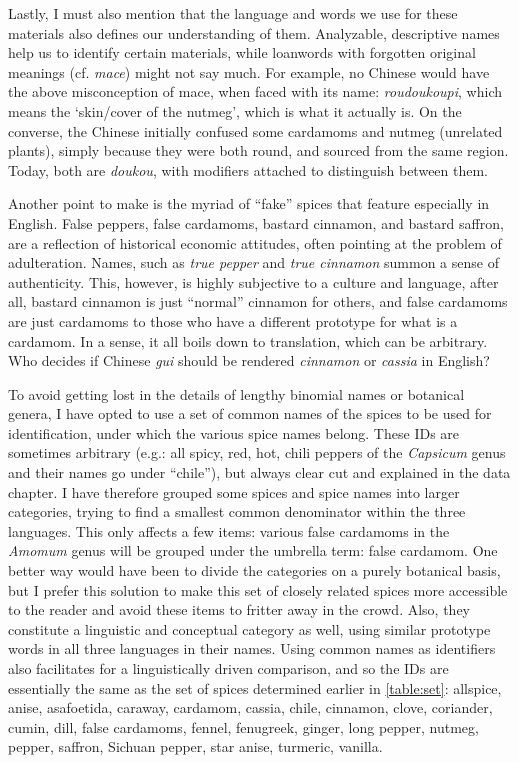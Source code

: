 Lastly, I must also mention that the language and words we use for these materials also defines our understanding of them. Analyzable, descriptive names help us to identify certain materials, while loanwords with forgotten original meanings (cf. \textit{mace}) might not say much. For example, no Chinese would have the above misconception of mace, when faced with its name:  \textit{roudoukoupi}, which means the `skin/cover of the nutmeg', which is what it actually is. On the converse, the Chinese initially confused some cardamoms and nutmeg (unrelated plants), simply because they were both round, and sourced from the same region. Today, both are  \textit{doukou}, with modifiers attached to distinguish between them.

Another point to make is the myriad of ``fake'' spices that feature especially in English. False peppers, false cardamoms, bastard cinnamon, and bastard saffron, are a reflection of historical economic attitudes, often pointing at the problem of adulteration. Names, such as \textit{true pepper} and \textit{true cinnamon} summon a sense of authenticity. This, however, is highly subjective to a culture and language, after all, bastard cinnamon is just ``normal'' cinnamon for others, and false cardamoms are just cardamoms to those who have a different prototype for what is a cardamom. In a sense, it all boils down to translation, which can be arbitrary. Who decides if Chinese  \textit{gui} should be rendered \textit{cinnamon} or \textit{cassia} in English? 

To avoid getting lost in the details of lengthy binomial names or botanical genera, I have opted to use a set of common names of the spices to be used for identification, under which the various spice names belong. These IDs are sometimes arbitrary (e.g.: all spicy, red, hot, chili peppers of the \textit{Capsicum} genus and their names go under ``chile''), but always clear cut and explained in the data chapter. I have therefore grouped some spices and spice names into larger categories, trying to find a smallest common denominator within the three languages. This only affects a few items: various false cardamoms in the \textit{Amomum} genus will be grouped under the umbrella term: false cardamom. One better way would have been to divide the categories on a purely botanical basis, but I prefer this solution to make this set of closely related spices more accessible to the reader and avoid these items to fritter away in the crowd. Also, they constitute a linguistic and conceptual category as well, using similar prototype words in all three languages in their names. Using common names as identifiers also facilitates for a linguistically driven comparison, and so the IDs are essentially the same as the set of spices determined earlier in \cref{table:set}: allspice, anise, asafoetida, caraway, cardamom, cassia, chile, cinnamon, clove, coriander, cumin, dill, false cardamoms, fennel, fenugreek, ginger, long pepper, nutmeg, pepper, saffron, Sichuan pepper, star anise, turmeric, vanilla.

